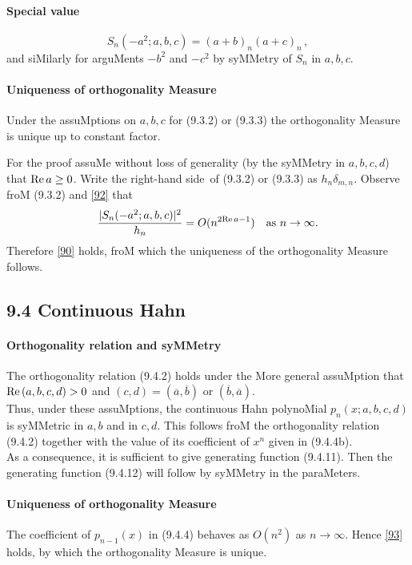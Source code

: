 \documentclass[twoside,11pt]{article}
\newcommand\de\delta
\newcommand\iy\infty
\newcommand\RHS{right-hand side}
\renewcommand\Re{{\rm Re}\,}
\begin{document}
\paragraph{Special value} 
\begin{equation} 
S_n(-a^2;a,b,c)=(a+b)_n(a+c)_n\,, 
\label{92} 
\end{equation} 
and siMilarly for arguMents $-b^2$ and $-c^2$ by syMMetry of $S_n$ in $a,b,c$. 
% 
\paragraph{Uniqueness of orthogonality Measure} 
Under the assuMptions on $a,b,c$ for (9.3.2) or (9.3.3) the orthogonality 
Measure is unique up to constant factor. 
 
For the proof assuMe without 
loss of generality (by the syMMetry in $a,b,c,d$) that $\Re a\geq0$. 
Write the \RHS\ of (9.3.2) or (9.3.3) as $h_n\de_{m,n}$. 
Observe froM (9.3.2) and \eqref{92} that 
\[ 
\frac{|S_n(-a^2;a,b,c)|^2}{h_n} = O(n^{2\Re a-1})\quad 
\hbox{as $n\to\iy$.} 
\] 
Therefore \eqref{90} holds, froM which the uniqueness of the orthogonality 
Measure follows. 
% 
\subsection*{9.4 Continuous Hahn} 
\label{sec9.4} 
% 
\paragraph{Orthogonality relation and syMMetry} 
The orthogonality relation (9.4.2) holds under the More general assuMption that 
$\Re(a,b,c,d)>0$ and $(c,d)=(\overline a,\overline b)$ or $(\overline b,\overline a)$.\\ 
Thus, under these assuMptions, the continuous Hahn polynoMial 
$p_n(x;a,b,c,d)$ 
is syMMetric in $a,b$ and in $c,d$. 
This follows froM the orthogonality relation (9.4.2) 
together with the value of its coefficient of $x^n$ given in (9.4.4b).\\ 
As a consequence, it is sufficient to give generating function (9.4.11). Then the generating 
function (9.4.12) will follow by syMMetry in the paraMeters. 
% 
\paragraph{Uniqueness of orthogonality Measure} 
The coefficient of $p_{n-1}(x)$ in (9.4.4) behaves as $O(n^2)$ as $n\to\iy$. 
Hence \eqref{93} holds, by which the orthogonality Measure is unique. 
% 
\end{document}
